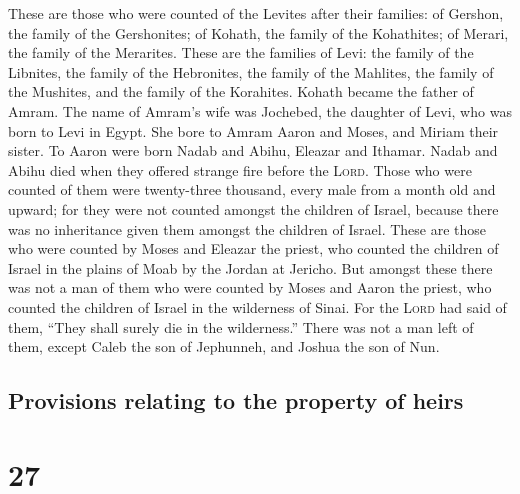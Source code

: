  These are those who were counted of the Levites after
their families: of Gershon, the family of the Gershonites; of Kohath,
the family of the Kohathites; of Merari, the family of the Merarites.
 These are the families of Levi: the family of the
Libnites, the family of the Hebronites, the family of the Mahlites, the
family of the Mushites, and the family of the Korahites. Kohath became
the father of Amram.  The name of Amram's wife was
Jochebed, the daughter of Levi, who was born to Levi in Egypt. She bore
to Amram Aaron and Moses, and Miriam their sister.  To
Aaron were born Nadab and Abihu, Eleazar and Ithamar. 
Nadab and Abihu died when they offered strange fire before the
\textsc{Lord}.  Those who were counted of them were
twenty-three thousand, every male from a month old and upward; for they
were not counted amongst the children of Israel, because there was no
inheritance given them amongst the children of Israel. 
These are those who were counted by Moses and Eleazar the priest, who
counted the children of Israel in the plains of Moab by the Jordan at
Jericho.  But amongst these there was not a man of them
who were counted by Moses and Aaron the priest, who counted the children
of Israel in the wilderness of Sinai.  For the
\textsc{Lord} had said of them, ``They shall surely die in the
wilderness.'' There was not a man left of them, except Caleb the son of
Jephunneh, and Joshua the son of Nun.

\hypertarget{provisions-relating-to-the-property-of-heirs}{%
\subsection{Provisions relating to the property of
heirs}\label{provisions-relating-to-the-property-of-heirs}}

\hypertarget{section-26}{%
\section{27}\label{section-26}}

